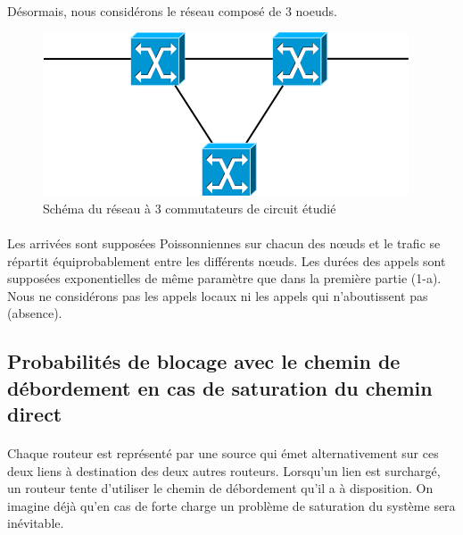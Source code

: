             \paragraph{}
Désormais, nous considérons le réseau composé de 3 noeuds.
%
            \begin{figure}[h]
                \centering
                \includegraphics[scale=0.6]{RSC/1-2.png}
                \caption{ Schéma du réseau à 3 commutateurs de circuit étudié }
                \label{ Schema du reseau a 3 commutateurs de circuit }
            \end{figure}
%
            \paragraph{}
Les arrivées sont supposées Poissonniennes sur chacun des nœuds et le trafic se répartit équiprobablement entre les différents nœuds.
Les durées des appels sont supposées exponentielles de même paramètre que dans la première partie (1-a).
Nous ne considérons pas les appels locaux ni les appels qui n'aboutissent pas (absence).
%
%
    \clearpage
%
%
        \subsection{Probabilités de blocage avec le chemin de débordement en cas de saturation du chemin direct}
%
            \paragraph{}
Chaque routeur est représenté par une source qui émet alternativement sur ces deux liens à destination des deux autres routeurs. Lorsqu'un lien est surchargé, un routeur tente d'utiliser le chemin de débordement qu'il a à disposition.
On imagine déjà qu'en cas de forte charge un problème de saturation du système sera inévitable.
%
